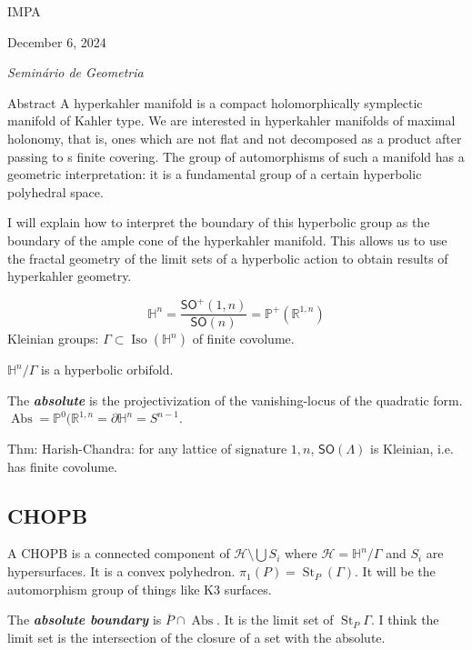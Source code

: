 {\Large \hfill IMPA}

\hfill{\large December 6, 2024

\hfill \textit{Seminário de Geometria}}
\vspace{2em}

\begin{thing4}{Abstract}
A hyperkahler manifold is a compact holomorphically symplectic manifold of Kahler type. We are interested in hyperkahler manifolds of maximal holonomy, that is, ones which are not flat and not decomposed as a product after passing to s finite covering. The group of automorphisms of such a manifold has a geometric interpretation: it is a fundamental group of a certain hyperbolic polyhedral space.

I will explain how to interpret the boundary of this hyperbolic group as the boundary of the ample cone of the hyperkahler manifold. This allows us to use the fractal geometry of the limit sets of a hyperbolic action to obtain results of hyperkahler geometry.
\end{thing4}
\vspace{2em}


\[\mathbb{H}^n=\frac{\mathsf{SO}^+(1,n)}{\mathsf{SO}(n)}=\mathbb{P}^+(\mathbb{R}^{1,n})\]
Kleinian groups: $\Gamma \subset \operatorname{Is o}(\mathbb{H}^n)$ of finite covolume.

$\mathbb{H}^n/\Gamma$ is a hyperbolic orbifold.

The \textit{\textbf{absolute}} is the projectivization of the vanishing-locus of the quadratic form. $\operatorname{A bs }=\mathbb{P}^0(\mathbb{R}^{1,n}=\partial\mathbb{H}^n=S^{n-1}$.


Thm: Harish-Chandra: for any lattice of signature $1,n$,  $\mathsf{SO}(\Lambda)$ is Kleinian, i.e. has finite covolume.

\subsection{CHOPB}

A CHOPB is a connected component of $\mathcal{H}\setminus \bigcup S_i $ where $\mathcal{H}=\mathbb{H}^n/\Gamma$ and $S_i$ are hypersurfaces. It is a convex polyhedron. $\pi_1(P)=\operatorname{St}_P(\Gamma)$. It will be the automorphism group of things like K3 surfaces.

The \textit{\textbf{absolute boundary}} is $\overline{P}\cap \operatorname{Ab s}$. It is the limit set of $\operatorname{S t}_P\Gamma$. I think the limit set is the intersection of the closure of a set with the absolute.

